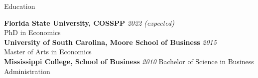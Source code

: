 \documentclass{resume} %
\begin{document}

\begin{rSection}{Education}

{\bf Florida State University, COSSPP} \hfill {\em 2022 (expected)} \\ 
PhD in Economics \\

{\bf University of South Carolina, Moore School of Business} \hfill {\em 2015} \\
Master of Arts in Economics \\

{\bf Mississippi College, School of Business} \hfill {\em 2010}
Bachelor of Science in Business Administration

\end{rSection}

\end{document}
